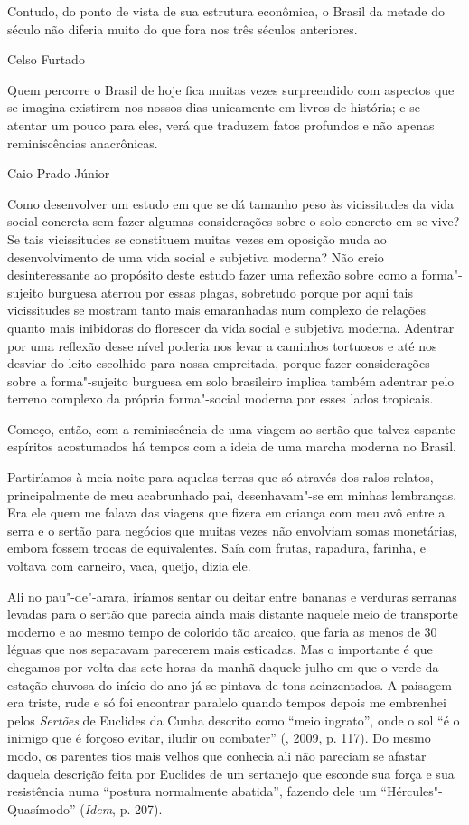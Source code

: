 \epigraph{Contudo, do ponto de vista de sua estrutura econômica, o Brasil da
metade do século  não diferia muito do que fora nos três séculos
anteriores.}{Celso Furtado}

\medskip

\epigraph{Quem percorre o Brasil de hoje fica muitas vezes surpreendido com
aspectos que se imagina existirem nos nossos dias unicamente em livros
de história; e se atentar um pouco para eles, verá que traduzem fatos
profundos e não apenas reminiscências anacrônicas.}{Caio Prado Júnior}


Como desenvolver um estudo em que se dá tamanho peso às vicissitudes da
vida social concreta sem fazer algumas considerações sobre o solo
concreto em se vive? Se tais vicissitudes se constituem muitas vezes em
oposição muda ao desenvolvimento de uma vida social e subjetiva moderna?
Não creio desinteressante ao propósito deste estudo fazer uma reflexão sobre como a
forma"-sujeito burguesa aterrou por essas plagas, sobretudo porque por
aqui tais vicissitudes se mostram tanto mais emaranhadas num complexo de
relações quanto mais inibidoras do florescer da vida social e subjetiva
moderna. Adentrar por uma reflexão desse nível poderia nos levar a
caminhos tortuosos e até nos desviar do leito escolhido para nossa
empreitada, porque fazer considerações sobre a forma"-sujeito burguesa em
solo brasileiro implica também adentrar pelo terreno complexo da própria
forma"-social moderna por esses lados tropicais.

Começo, então, com a reminiscência de uma viagem ao sertão que talvez espante
espíritos acostumados há tempos com a ideia de uma marcha moderna no
Brasil.

Partiríamos à meia noite para aquelas terras que só através dos
ralos relatos, principalmente de meu acabrunhado pai, desenhavam"-se em
minhas lembranças. Era ele quem me falava das viagens que fizera em
criança com meu avô entre a serra e o sertão para negócios que muitas
vezes não envolviam somas monetárias, embora fossem trocas de
equivalentes. Saía com frutas, rapadura, farinha, e voltava com
carneiro, vaca, queijo, dizia ele.

Ali no pau"-de"-arara, iríamos sentar ou deitar entre bananas e verduras
serranas levadas para o sertão que parecia ainda mais distante naquele
meio de transporte moderno e ao mesmo tempo de colorido tão arcaico, que
faria as menos de 30 léguas que nos separavam parecerem mais esticadas.
Mas o importante é que chegamos por volta das sete horas da manhã
daquele julho em que o verde da estação chuvosa do início do ano já se pintava
de tons acinzentados. A paisagem era triste, rude e só foi encontrar paralelo
quando tempos depois me embrenhei pelos \emph{Sertões} de Euclides da
Cunha descrito como ``meio ingrato'', onde o sol ``é o inimigo que é
forçoso evitar, iludir ou combater'' (, 2009, p. 117). Do mesmo
modo, os parentes tios mais velhos que conhecia ali não pareciam se
afastar daquela descrição feita por Euclides de um sertanejo que esconde
sua força e sua resistência numa ``postura normalmente abatida'',
fazendo dele um ``Hércules"-Quasímodo'' (\emph{Idem}, p. 207).

